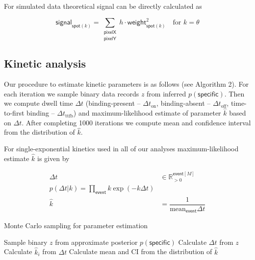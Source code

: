 For simulated data theoretical signal can be directly calculated as

\begin{equation}
    \mathsf{signal}_{\mathsf{spot}(k)} =  \sum_{\substack{\mathsf{pixelX} \\ \mathsf{pixelY}}} h \cdot \mathsf{weight}_{\mathsf{spot}(k)}^2 \quad \textrm{for } k = \theta
\end{equation}

\subsection*{Kinetic analysis}

Our procedure to estimate kinetic parameters is as follows (see Algorithm 2). For each iteration we sample binary data records $z$ from inferred $p(\mathsf{specific})$. Then we compute dwell time $\Delta t$ (binding-present -- $\Delta t_\mathrm{on}$, binding-absent -- $\Delta t_\mathrm{off}$, time-to-first binding -- $\Delta t_\mathrm{ttfb}$) and maximum-likelihood estimate of parameter $\hat{k}$ based on $\Delta t$. After completing 1000 iterations we compute mean and confidence interval from the distribution of $\hat{k}$.

For single-exponential kinetics used in all of our analyses maximum-likelihood estimate $\hat{k}$ is given by

\begin{subequations}
\begin{align}
    \Delta t &\in \mathbb{R}_{>0}^{\mathsf{event}[M]} \\
    p(\Delta t | k) = \prod_\mathsf{event} k \exp (- k \Delta t) \\
    \hat{k} &= \dfrac{1}{\mathrm{mean}_{\mathsf{event}} \Delta t}
\end{align}
\end{subequations}

\begin{algorithm}
\caption{Monte Carlo sampling for parameter estimation}
\begin{algorithmic}[1]
    \State Sample binary $z$ from approximate posterior $p(\mathsf{specific})$
    \State Calculate $\Delta t$ from $z$
    \State Calculate $\hat{k}_i$ from $\Delta t$
\EndFor{}
\State Calculate mean and CI from the distribution of $\hat{k}$
\end{algorithmic}
\end{algorithm}



